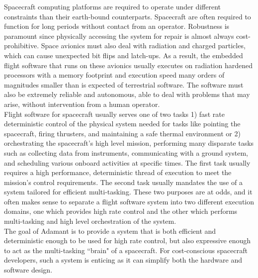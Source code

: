 Spacecraft computing platforms are required to operate under different constraints than their earth-bound counterparts. Spacecraft are often required to function for long periods without contact from an operator. Robustness is paramount since physically accessing the system for repair is almost always cost-prohibitive. Space avionics must also deal with radiation and charged particles, which can cause unexpected bit flips and latch-ups. As a result, the embedded flight software that runs on these avionics usually executes on radiation hardened processors with a memory footprint and execution speed many orders of magnitudes smaller than is expected of terrestrial software. The software must also be extremely reliable and autonomous, able to deal with problems that may arise, without intervention from a human operator. \\

Flight software for spacecraft usually serves one of two tasks 1) fast rate deterministic control of the physical system needed for tasks like pointing the spacecraft, firing thrusters, and maintaining a safe thermal environment or 2) orchestrating the spacecraft's high level mission, performing many disparate tasks such as collecting data from instruments, communicating with a ground system, and scheduling various onboard activities at specific times. The first task usually requires a high performance, deterministic thread of execution to meet the mission's control requirements. The second task usually mandates the use of a system tailored for efficient multi-tasking. These two purposes are at odds, and it often makes sense to separate a flight software system into two different execution domains, one which provides high rate control and the other which performs multi-tasking and high level orchestration of the system. \\

The goal of Adamant is to provide a system that is both efficient and deterministic enough to be used for high rate control, but also expressive enough to act as the multi-tasking ``brain" of a spacecraft. For cost-conscious spacecraft developers, such a system is enticing as it can simplify both the hardware and software design. \\


